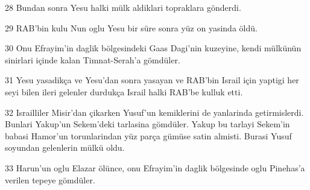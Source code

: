 \par 28 Bundan sonra Yesu halki mülk aldiklari topraklara gönderdi.
\par 29 RAB'bin kulu Nun oglu Yesu bir süre sonra yüz on yasinda öldü.
\par 30 Onu Efrayim'in daglik bölgesindeki Gaas Dagi'nin kuzeyine, kendi mülkünün sinirlari içinde kalan Timnat-Serah'a gömdüler.
\par 31 Yesu yasadikça ve Yesu'dan sonra yasayan ve RAB'bin Israil için yaptigi her seyi bilen ileri gelenler durdukça Israil halki RAB'be kulluk etti.
\par 32 Israilliler Misir'dan çikarken Yusuf'un kemiklerini de yanlarinda getirmislerdi. Bunlari Yakup'un Sekem'deki tarlasina gömdüler. Yakup bu tarlayi Sekem'in babasi Hamor'un torunlarindan yüz parça gümüse satin almisti. Burasi Yusuf soyundan gelenlerin mülkü oldu.
\par 33 Harun'un oglu Elazar ölünce, onu Efrayim'in daglik bölgesinde oglu Pinehas'a verilen tepeye gömdüler.


